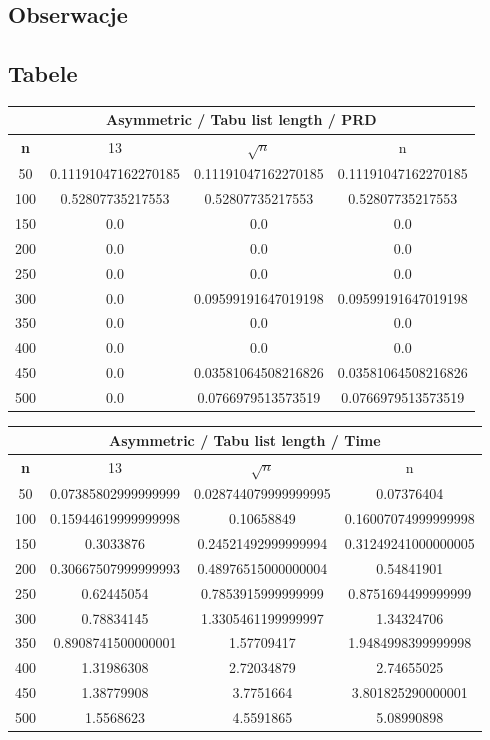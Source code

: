 \documentclass{article}
\begin{document}
\subsection{Obserwacje}

\subsection{Tabele}

\begin{center}
\begin{tabular}{|c|c|c|c|}
\hline
\multicolumn{4}{|c|}{\textbf{Asymmetric / Tabu list length / PRD}}\\
\hline
\textbf{n} & 13 & $\sqrt{n}$ & n\\
\hline
50 & 0.11191047162270185 & 0.11191047162270185 & 0.11191047162270185\\
\hline
100 & 0.52807735217553 & 0.52807735217553 & 0.52807735217553\\
\hline
150 & 0.0 & 0.0 & 0.0\\
\hline
200 & 0.0 & 0.0 & 0.0\\
\hline
250 & 0.0 & 0.0 & 0.0\\
\hline
300 & 0.0 & 0.09599191647019198 & 0.09599191647019198\\
\hline
350 & 0.0 & 0.0 & 0.0\\
\hline
400 & 0.0 & 0.0 & 0.0\\
\hline
450 & 0.0 & 0.03581064508216826 & 0.03581064508216826\\
\hline
500 & 0.0 & 0.0766979513573519 & 0.0766979513573519\\
\hline
\end{tabular}
\end{center}


\begin{center}
\begin{tabular}{|c|c|c|c|}
\hline
\multicolumn{4}{|c|}{\textbf{Asymmetric / Tabu list length / Time}}\\
\hline
\textbf{n} & 13 & $\sqrt{n}$ & n\\
\hline
50 & 0.07385802999999999 & 0.028744079999999995 & 0.07376404\\
\hline
100 & 0.15944619999999998 & 0.10658849 & 0.16007074999999998\\
\hline
150 & 0.3033876 & 0.24521492999999994 & 0.31249241000000005\\
\hline
200 & 0.30667507999999993 & 0.48976515000000004 & 0.54841901\\
\hline
250 & 0.62445054 & 0.7853915999999999 & 0.8751694499999999\\
\hline
300 & 0.78834145 & 1.3305461199999997 & 1.34324706\\
\hline
350 & 0.8908741500000001 & 1.57709417 & 1.9484998399999998\\
\hline
400 & 1.31986308 & 2.72034879 & 2.74655025\\
\hline
450 & 1.38779908 & 3.7751664 & 3.801825290000001\\
\hline
500 & 1.5568623 & 4.5591865 & 5.08990898\\
\hline
\end{tabular}
\end{center}
\end{document}
